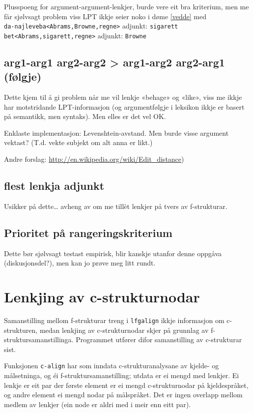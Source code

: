 \documentclass[11pt,a4paper,oneside,draft]{book}
\begin{document}
    Plusspoeng for argument-argument-lenkjer, burde vere eit bra
    kriterium, men me får sjølvsagt problem viss LPT ikkje seier noko
    i døme \ref{vedde} med \\
    \texttt{da-najleveba<Abrams,Browne,regne>} adjunkt: \texttt{sigarett}\\
    \texttt{bet<Abrams,sigarett,regne>} adjunkt: \texttt{Browne}
    
\subsection{arg1-arg1 arg2-arg2 > arg1-arg2 arg2-arg1 (følgje)}
\label{sec-4.2.3}

    Dette kjem til å gi problem når me vil lenkje «behage» og «like»,
    viss me ikkje har motstridande LPT-informasjon (og argumentfølgje
    i leksikon ikkje er basert på semantikk, men syntaks). Men elles
    er det vel OK.

    Enklaste implementasjon: Levenshtein-avstand. Men burde visse
    argument vektast? (T.d. vekte subjekt om alt anna er likt.)

    Andre forslag: \href{http://en.wikipedia.org/wiki/Edit_distance}{http://en.wikipedia.org/wiki/Edit\_distance})
\subsection{flest lenkja adjunkt}
\label{sec-4.2.4}

    Usikker på dette\ldots{} avheng av om me tillèt lenkjer på tvers av
    f-strukturar.
\subsection{Prioritet på rangeringskriterium}
\label{sec-4.2.5}

    Dette bør sjølvsagt testast empirisk, blir kanskje utanfor denne
    oppgåva (diskusjonsdel?), men kan jo prøve meg litt rundt.
\section{Lenkjing av c-strukturnodar}
\label{sec-4.3}

Samanstilling mellom f-strukturar treng i \texttt{lfgalign} ikkje informasjon
om c-strukturen, medan lenkjing av c-strukturnodar skjer på grunnlag
av f-struktursamanstillinga. Programmet utfører difor samanstilling av
c-strukturar sist.

Funksjonen \texttt{c-align} har som inndata c-strukturanalysane av kjelde- og
målsetninga, og éi f-struktursamanstilling; utdata er ei mengd med
lenkjer. Ei lenkje er eit par der første element er ei mengd
c-strukturnodar på kjeldespråket, og andre element ei mengd nodar på
målspråket. Det er ingen overlapp mellom medlem av lenkjer (ein node
er aldri med i meir enn eitt par).
\end{document}
